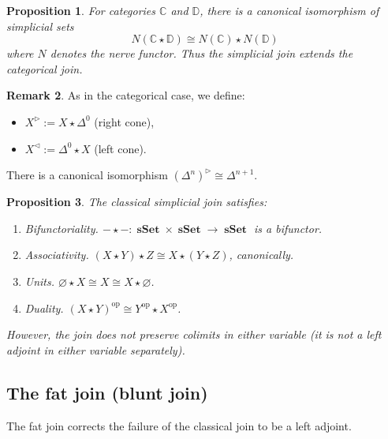\documentclass{article}
\newtheorem{proposition}{Proposition}
\theoremstyle{definition}
\newtheorem{remark}[proposition]{Remark}
\newcommand{\C}{\mathbb{C}}
\newcommand{\D}{\mathbb{D}}
\DeclareMathOperator{\sSet}{\mathbf{sSet}}
\begin{document}
\begin{proposition}\label{join-sset-nerve}
	For categories $\C$ and $\D$, there is a canonical isomorphism of simplicial sets
	\[N(\C \star \D) \cong N(\C) \star N(\D)\]
	where $N$ denotes the nerve functor. Thus the simplicial join extends the categorical join.
\end{proposition}

\begin{remark}\label{left-right-cones-sset}
	As in the categorical case, we define:
	\begin{itemize}
		\item $X^\triangleright := X \star \Delta^0$ (right cone),
		\item $X^\triangleleft := \Delta^0 \star X$ (left cone).
	\end{itemize}
	There is a canonical isomorphism $(\Delta^n)^\triangleright \cong \Delta^{n+1}$.
\end{remark}

\begin{proposition}\label{classical-join-props}
	The classical simplicial join satisfies:
	\begin{enumerate}
		\item \emph{Bifunctoriality.} $- \star - : \sSet \times \sSet \to \sSet$ is a bifunctor.
		\item \emph{Associativity.} $(X \star Y) \star Z \cong X \star (Y \star Z)$, canonically.
		\item \emph{Units.} $\varnothing \star X \cong X \cong X \star \varnothing$.
		\item \emph{Duality.} $(X \star Y)^{\mathrm{op}} \cong Y^{\mathrm{op}} \star X^{\mathrm{op}}$.
	\end{enumerate}
	However, the join does \emph{not} preserve colimits in either variable (it is not a left adjoint in either variable separately).
\end{proposition}

\subsection{The fat join (blunt join)}

The fat join corrects the failure of the classical join to be a left adjoint.
\end{document}
